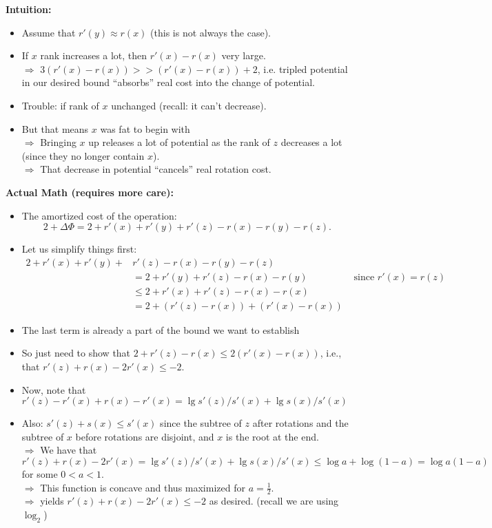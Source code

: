 \documentclass{article}
\begin{document}
{\bf Intuition:}
\begin{itemize}
\item Assume that $r'(y)\approx r(x)$ (this is not always the case).
\item If $x$ rank increases a lot, then $r'(x)-r(x)$ very large.\\ 
$\Rightarrow$ $3(r'(x)-r(x)) >> (r'(x)-r(x))+2$, i.e. tripled potential in our desired bound ``absorbs''  real cost into the change of potential. 
\item Trouble: if rank of $x$ unchanged (recall: it can't decrease).
\item But that means $x$ was fat to begin with  \\
$\Rightarrow$ Bringing $x$ up releases a lot of potential as the rank of $z$ decreases a lot (since they no longer contain $x$).\\
$\Rightarrow$ That decrease in potential ``cancels'' real rotation cost.
\end{itemize}

{\bf Actual Math (requires more care):}
\begin{itemize}
\item The amortized cost of the operation:
\[
2+\Delta \Phi = 2+r'(x)+r'(y) + r'(z)-r(x)-r(y)-r(z).
\]
\item Let us simplify things first:
\begin{align*}
2+r'(x)+r'(y) +& r'(z)-r(x)-r(y)-r(z)\\
&= 2+r'(y)+r'(z)-r(x)-r(y)&  \text{ since $r'(x)=r(z)$}\\
&\le 2+r'(x)+r'(z)-r(x)-r(x)\\
&=2 +(r'(z)-r(x))+ (r'(x)-r(x))
\end{align*}
\item The last term is already a part of the bound we want to establish
\item So just need to show that $2+r'(z)-r(x) \le 2(r'(x)-r(x))$, i.e., that $r'(z)+r(x)-2r'(x) \le -2$.
\item Now,  note that $r'(z)-r'(x) + r(x)-r'(x) = \lg s'(z)/s'(x) + \lg s(x)/s'(x)$
\item Also: $s'(z) + s(x) \le s'(x)$ since the subtree of $z$ after rotations and the subtree of $x$ before rotations are disjoint, and $x$ is the root at the end. \\
$\Rightarrow$ We have that 
\[
r'(z)+r(x)-2r'(x) =\lg s'(z)/s'(x) + \lg s(x)/s'(x)\le \log a + \log(1-a)=\log a(1-a)
\] 
for some $0 < a < 1$.\\
$\Rightarrow$ This function is concave and thus maximized for $a=\frac{1}{2}$.\\
$\Rightarrow$ yields $r'(z)+r(x)-2r'(x) \leq -2$ as desired. (recall we are using $\log_2$)
\end{itemize}
\end{document}
